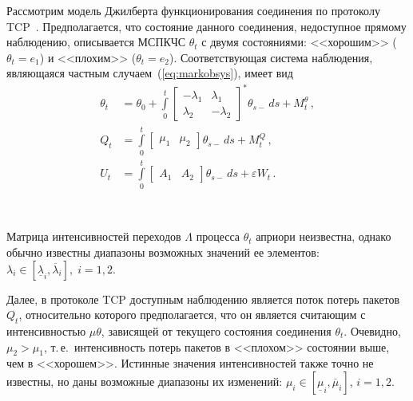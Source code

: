 \begin{multicols}{2}
 Рассмотрим модель Джилберта функционирования соединения по протоколу
 TCP~\cite{gilb}. Предполагается, что состояние данного соединения,
 недоступное прямому наблюдению, описывается \mbox{МСПКЧС} $\theta_t$ с двумя
 состояниями: <<хорошим>> ($\theta_t=e_1$) и <<плохим>> ($\theta_t=e_2$).
 Соответствующая система наблюдения, являющаяся частным случаем~(\ref{eq:markobsys}),
 имеет вид
 \begin{align*}
 \theta_t&=\theta_0+\int\limits_0^t
 \begin{bmatrix}
 -\lambda_1 & \lambda_1 \\
 \lambda_2 & -\lambda_2
 \end{bmatrix}^*\theta_{s-}\,ds+ M^{\theta}_t\,,\\
 Q_t &=
 \int\limits_0^t
 \begin{bmatrix}
 \mu_1 & \mu_2
 \end{bmatrix}
 \theta_{s-}\,ds+ M^{Q}_t\,,\\
 U_t &=
 \int\limits_0^t
 \begin{bmatrix}
 A_1 & A_2
 \end{bmatrix}
 \theta_{s-}\,ds+ \varepsilon W_t\,.
 \end{align*}

\begin{figure*} %
\vspace*{1pt}
\begin{center}
\mbox{%
\epsfxsize=123.019mm
}
\end{center}
\vspace*{-9pt} 
\end{figure*}

 Матрица интенсивностей переходов $\Lambda$ процесса $\theta_t$ априори
 неизвестна, однако обычно известны диапазоны возможных значений ее элементов:
 $\lambda_i \in [\underline{\lambda}_i,
 \overline{\lambda}_i], \; i=1,2$.

 Далее, в протоколе TCP доступным наблюдению является поток потерь
 пакетов $Q_t$, относительно которого предполагается, что он
 является считающим с интенсивностью $\mu \theta$, зависящей от текущего состояния соединения $\theta_t$.
 Очевидно, $\mu_2 > \mu_1$, т.\,е.\ интенсивность потерь пакетов в
<<плохом>> состоянии выше, чем в <<хорошем>>. Истинные значения
 интенсивностей также точно не известны, но даны возможные диапазоны их
 изменений: $\mu_i \in [\underline{\mu}_i, \overline{\mu}_i]$, $ i=1,2$.


\end{multicols}
